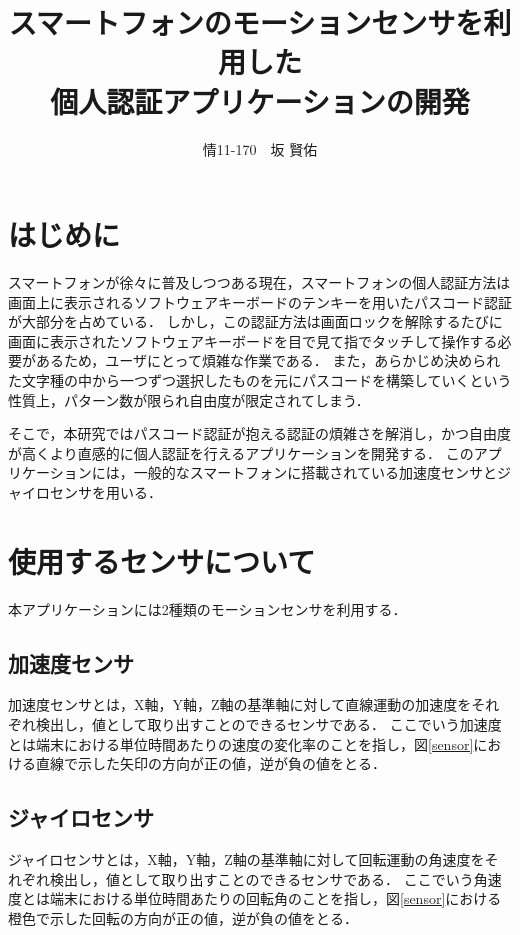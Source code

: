 \documentclass[11pt]{jreport}
\title{\bfseries スマートフォンのモーションセンサを利用した\\個人認証アプリケーションの開発}
\author{情11-170　\UTF{9AD9}坂 賢佑}
\date{}
\begin{document}
\maketitle

\tableofcontents
\listoffigures

\chapter*{はじめに}
スマートフォンが徐々に普及しつつある現在，スマートフォンの個人認証方法は画面上に表示されるソフトウェアキーボードのテンキーを用いたパスコード認証が大部分を占めている．
しかし，この認証方法は画面ロックを解除するたびに画面に表示されたソフトウェアキーボードを目で見て指でタッチして操作する必要があるため，ユーザにとって煩雑な作業である．
また，あらかじめ決められた文字種の中から一つずつ選択したものを元にパスコードを構築していくという性質上，パターン数が限られ自由度が限定されてしまう．

そこで，本研究ではパスコード認証が抱える認証の煩雑さを解消し，かつ自由度が高くより直感的に個人認証を行えるアプリケーションを開発する．
このアプリケーションには，一般的なスマートフォンに搭載されている加速度センサとジャイロセンサを用いる．

\chapter{使用するセンサについて}
本アプリケーションには2種類のモーションセンサを利用する．

    \section{加速度センサ}
    加速度センサとは，X軸，Y軸，Z軸の基準軸に対して直線運動の加速度をそれぞれ検出し，値として取り出すことのできるセンサである．
    ここでいう加速度とは端末における単位時間あたりの速度の変化率のことを指し，図\ref{sensor}における直線で示した矢印の方向が正の値，逆が負の値をとる．

    \section{ジャイロセンサ}
    ジャイロセンサとは，X軸，Y軸，Z軸の基準軸に対して回転運動の角速度をそれぞれ検出し，値として取り出すことのできるセンサである．
    ここでいう角速度とは端末における単位時間あたりの回転角のことを指し，図\ref{sensor}における橙色で示した回転の方向が正の値，逆が負の値をとる．
\end{document}
